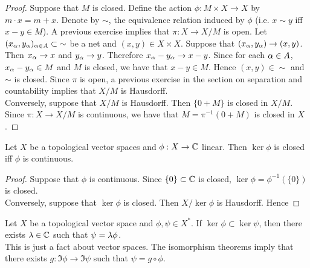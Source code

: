 \documentclass{book}
\begin{document}
	\begin{proof}
		Suppose that $M$ is closed. Define the action $\phi: M \times X \rightarrow X$ by $m \cdot x = m  + x$. Denote by $\sim$, the equivalence relation induced by $\phi$ (i.e. $x \sim y$ iff $x-y \in M$). A previous exercise implies that $\pi: X \rightarrow X /M$ is open. Let $(x_{\alpha},y_{\alpha})_{\alpha \in A} \subset  {\sim}$ be a net and $(x,y) \in X \times X$. Suppose that $(x_{\alpha},y_{\alpha}) \rightarrow (x,y)$. Then $x_{\alpha} \rightarrow x$ and $y_{\alpha} \rightarrow y$. Therefore $x_{\alpha} - y_{\alpha} \rightarrow x -y$. Since for each $\alpha \in A$, $x_{\alpha} - y_{\alpha} \in M$ and $M$ is closed, we have that $x -y \in M$. Hence $(x,y) \in  {\sim}$ and $\sim$ is closed. Since $\pi$ is open, a previous exercise in the section on separation and countability implies that $X / M$ is Hausdorff. \\
		Conversely, suppose that $X/ M$ is Hausdorff. Then $\{0 + M\}$ is closed in $X /M$. Since $\pi: X \rightarrow X/M$ is continuous, we have that $M =  \pi^{-1}(0 + M)$ is closed in $X$.
	\end{proof}

	\begin{ex}
		Let $X$ be a topological vector spaces and $\phi : X \rightarrow \mathbb{C}$ linear. Then $\ker \phi$ is closed iff $\phi$ is continuous. \\
	\end{ex}
	
	\begin{proof}
		Suppose that $\phi$ is continuous. Since $\{0\} \subset \mathbb{C}$ is closed, $\ker \phi = \phi^{-1}(\{0\})$ is closed. \\ Conversely, suppose that $\ker \phi$ is closed. Then $X/ \ker \phi$ is Hausdorff. Hence 
		\tcb{FINISH!!!}
	\end{proof}
	
	\begin{ex}
		Let $X$ be a topological vector space and $\phi,\psi \in X^*$. If $\ker  \phi \subset \ker \psi$, then there exists $\lambda \in \mathbb{C}$ such that $\psi = \lambda \phi$.\\
		 This is just a fact about vector spaces. The isomorphism theorems imply that there exists $g: \Im \phi \rightarrow \Im \psi$ such that $\psi = g \circ \phi$. 
	\end{ex}
\end{document}
